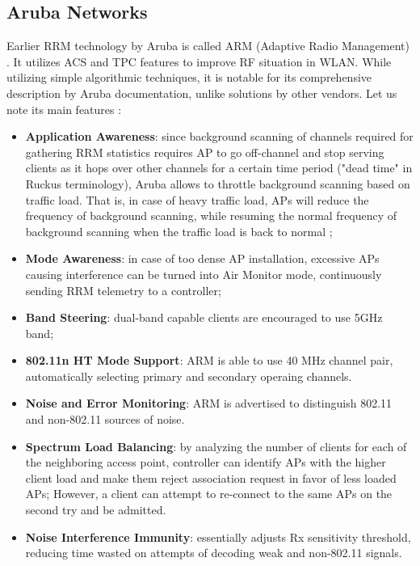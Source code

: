 \subsection{Aruba Networks}
Earlier RRM technology by Aruba is called ARM (Adaptive Radio Management) \cite{arubaARM}. It utilizes ACS and TPC features to improve RF situation in WLAN. While utilizing simple algorithmic techniques, it is notable for its comprehensive description by Aruba documentation, unlike solutions by other vendors.
Let us note its main features \cite{ARMOverview}:
\begin{itemize}
    \item \textbf{Application Awareness}: since background scanning of channels required for gathering RRM statistics requires AP to go off-channel and stop serving clients as it hops over other channels for a certain time period ("dead time" in Ruckus terminology), Aruba allows to throttle background scanning based on traffic load. That is, in case of heavy traffic load, APs will reduce the frequency of background scanning, while resuming the normal frequency of background scanning when the traffic load is back to normal \cite{UnderstandingARM};
    \item \textbf{Mode Awareness}: in case of too dense AP installation, excessive APs causing interference can be turned into Air Monitor mode, continuously sending RRM telemetry to a controller;
    \item \textbf{Band Steering}: dual-band capable clients are encouraged to use 5GHz band;
    \item \textbf{802.11n HT Mode Support}: ARM is able to use 40 MHz channel pair, automatically selecting primary and secondary operaing channels.
    \item \textbf{Noise and Error Monitoring}: ARM is advertised to distinguish 802.11 and non-802.11 sources of noise.
    \item \textbf{Spectrum Load Balancing}: by analyzing the number of clients for each of the neighboring access point, controller can identify APs with the higher client load and make them reject association request in favor of less loaded APs; However, a client can attempt to re-connect to the same APs on the second try and be admitted.
    \item \textbf{Noise Interference Immunity}: essentially adjusts Rx sensitivity threshold, reducing time wasted on attempts of decoding weak and non-802.11 signals.
\end{itemize}

